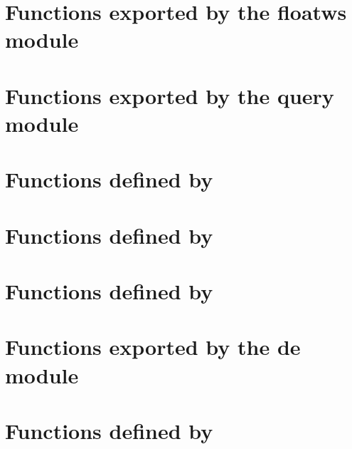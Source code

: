\documentclass[english,a4paper,11pt,oldtoc,mctitle]{rapport3}
\begin{document}


\section{Functions exported by the floatws module}
\label{sec:floatwsref}



\section{Functions exported by the query module}
\label{sec:queryref}



\section{Functions defined by }
\label{sec:ioncorelibref}



\section{Functions defined by }
\label{sec:mplexfnsref}



\section{Functions defined by }
\label{sec:querylibref}



\section{Functions exported by the de module}
\label{sec:deref}



\section{Functions defined by }
\label{sec:delibref}



\appendix



\printindex
\end{document}

